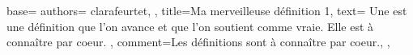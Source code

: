{
  base={
    authors={
      clarafeurtet,
    },
    title=Ma merveilleuse définition 1,
    text={
      Une  est une définition que l'on avance et que l'on soutient comme vraie. Elle est à connaître par coeur.
    },
    comment={Les définitions sont à connaître par coeur.},
  },
}
